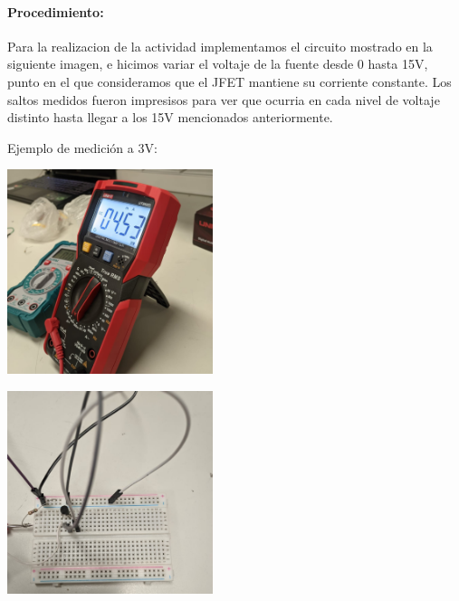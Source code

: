 \paragraph{Procedimiento:}

Para la realizacion de la actividad implementamos el circuito mostrado en la siguiente imagen, e hicimos variar el voltaje de la fuente desde 0 hasta 15V, punto en el que consideramos que el JFET mantiene su corriente constante. Los saltos medidos fueron impresisos para ver que ocurria en cada nivel de voltaje distinto hasta llegar a los 15V mencionados anteriormente.


Ejemplo de medición a 3V:

\includegraphics[width=6cm]{./imagenes/Res1.jpg}

\includegraphics[width=6cm]{./imagenes/Lab1.jpg}


\begin{table}[ht]
\end{table}

